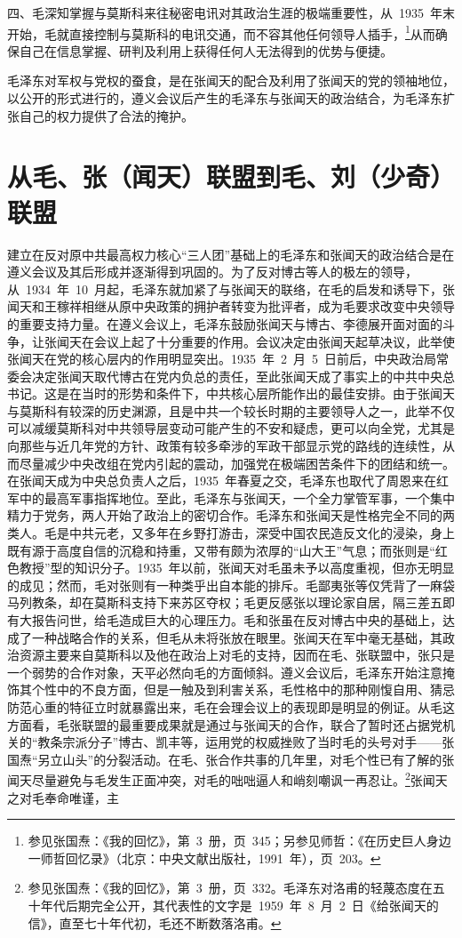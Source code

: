四、毛深知掌握与莫斯科来往秘密电讯对其政治生涯的极端重要性，从~1935~年末开始，毛就直接控制与莫斯科的电讯交通，而不容其他任何领导人插手，\footnote{参见张国焘：《我的回忆》，第~3~册，页~345；另参见师哲：《在历史巨人身边一师哲回忆录》（北京：中央文献出版社，1991~年），页~203。}从而确保自己在信息掌握、研判及利用上获得任何人无法得到的优势与便捷。

毛泽东对军权与党权的蚕食，是在张闻天的配合及利用了张闻天的党的领袖地位，以公开的形式进行的，遵义会议后产生的毛泽东与张闻天的政治结合，为毛泽东扩张自己的权力提供了合法的掩护。

\section{从毛、张（闻天）联盟到毛、刘（少奇）联盟}

建立在反对原中共最高权力核心“三人团”基础上的毛泽东和张闻天的政治结合是在遵义会议及其后形成并逐渐得到巩固的。为了反对博古等人的极左的领导，从~1934~年~10~月起，毛泽东就加紧了与张闻天的联络，在毛的启发和诱导下，张闻天和王稼祥相继从原中央政策的拥护者转变为批评者，成为毛要求改变中央领导的重要支持力量。在遵义会议上，毛泽东鼓励张闻天与博古、李德展开面对面的斗争，让张闻天在会议上起了十分重要的作用。会议决定由张闻天起草决议，此举使张闻天在党的核心层内的作用明显突出。1935~年~2~月~5~日前后，中央政治局常委会决定张闻天取代博古在党内负总的责任，至此张闻天成了事实上的中共中央总书记。这是在当时的形势和条件下，中共核心层所能作出的最佳安排。由于张闻天与莫斯科有较深的历史渊源，且是中共一个较长时期的主要领导人之一，此举不仅可以减缓莫斯科对中共领导层变动可能产生的不安和疑虑，更可以向全党，尤其是向那些与近几年党的方针、政策有较多牵涉的军政干部显示党的路线的连续性，从而尽量减少中央改组在党内引起的震动，加强党在极端困苦条件下的团结和统一。在张闻天成为中央总负责人之后，1935~年春夏之交，毛泽东也取代了周恩来在红军中的最高军事指挥地位。至此，毛泽东与张闻天，一个全力掌管军事，一个集中精力于党务，两人开始了政治上的密切合作。毛泽东和张闻天是性格完全不同的两类人。毛是中共元老，又多年在乡野打游击，深受中国农民造反文化的浸染，身上既有源于高度自信的沉稳和持重，又带有颇为浓厚的“山大王”气息；而张则是“红色教授”型的知识分子。1935~年以前，张闻天对毛虽未予以高度重视，但亦无明显的成见；然而，毛对张则有一种类乎出自本能的排斥。毛鄙夷张等仅凭背了一麻袋马列教条，却在莫斯科支持下来苏区夺权；毛更反感张以理论家自居，隔三差五即有大报告问世，给毛造成巨大的心理压力。毛和张虽在反对博古中央的基础上，达成了一种战略合作的关系，但毛从未将张放在眼里。张闻天在军中毫无基础，其政治资源主要来自莫斯科以及他在政治上对毛的支持，因而在毛、张联盟中，张只是一个弱势的合作对象，天平必然向毛的方面倾斜。遵义会议后，毛泽东开始注意掩饰其个性中的不良方面，但是一触及到利害关系，毛性格中的那种刚愎自用、猜忌防范心重的特征立时就暴露出来，毛在会理会议上的表现即是明显的例证。从毛这方面看，毛张联盟的最重要成果就是通过与张闻天的合作，联合了暂时还占据党机关的“教条宗派分子”博古、凯丰等，运用党的权威挫败了当时毛的头号对手——张国焘“另立山头”的分裂活动。在毛、张合作共事的几年里，对毛个性已有了解的张闻天尽量避免与毛发生正面冲突，对毛的咄咄逼人和峭刻嘲讽一再忍让。\footnote{参见张国焘：《我的回忆》，第~3~册，页~332。毛泽东对洛甫的轻蔑态度在五十年代后期完全公开，其代表性的文字是~1959~年~8~月~2~日《给张闻天的信》，直至七十年代初，毛还不断数落洛甫。}张闻天之对毛奉命唯谨，主